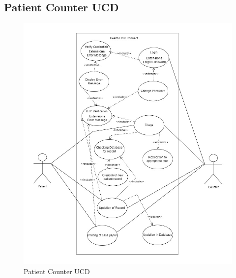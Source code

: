 \subsection{Patient Counter UCD}
\begin{figure}[h!]
    \centering
    \includegraphics[width=1.1\textwidth]{Patient_Counter_UCD (1).jpg}
    \caption{Patient Counter UCD}
    \label{fig:patient_counter_ucd}
\end{figure}
\clearpage
